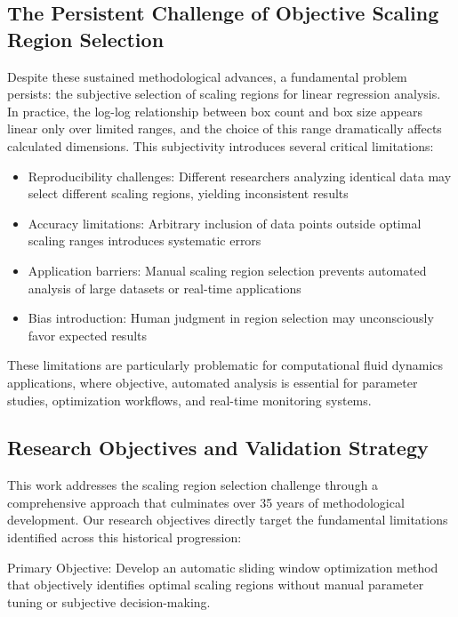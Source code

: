 \documentclass[preprint,12pt]{elsarticle}
\def\textbf#1{#1}%
\begin{document}
\subsection{The Persistent Challenge of Objective Scaling Region Selection}

Despite these sustained methodological advances, a fundamental problem persists: the subjective selection of scaling regions for linear regression analysis. In practice, the log-log relationship between box count and box size appears linear only over limited ranges, and the choice of this range dramatically affects calculated dimensions. This subjectivity introduces several critical limitations:

\begin{itemize}
\item \textbf{Reproducibility challenges}: Different researchers analyzing identical data may select different scaling regions, yielding inconsistent results
\item \textbf{Accuracy limitations}: Arbitrary inclusion of data points outside optimal scaling ranges introduces systematic errors
\item \textbf{Application barriers}: Manual scaling region selection prevents automated analysis of large datasets or real-time applications
\item \textbf{Bias introduction}: Human judgment in region selection may unconsciously favor expected results
\end{itemize}

These limitations are particularly problematic for computational fluid dynamics applications, where objective, automated analysis is essential for parameter studies, optimization workflows, and real-time monitoring systems.

\subsection{Research Objectives and Validation Strategy}

This work addresses the scaling region selection challenge through a comprehensive approach that culminates over 35 years of methodological development. Our research objectives directly target the fundamental limitations identified across this historical progression:

\textbf{Primary Objective}: Develop an automatic sliding window optimization method that objectively identifies optimal scaling regions without manual parameter tuning or subjective decision-making.
\end{document}
